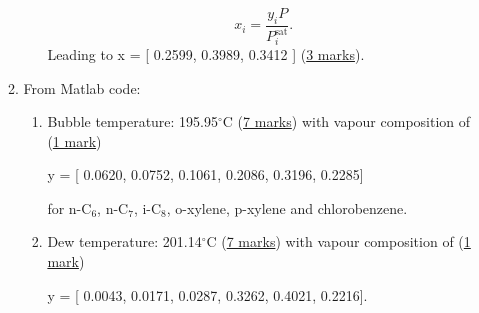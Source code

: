 \documentclass[12pts,a4paper,amsmath,amssymb,floatfix]{article}%
\newcommand{\frc}{\displaystyle\frac}
\begin{document}
\begin{enumerate}[label=\bfseries Problem \arabic*:]
\begin{enumerate}[label=\bfseries Task \arabic*:]
\begin{enumerate}
                      \begin{displaymath}
                         x_{i} = \frc{y_{i}P}{P_{i}^{\text{sat}}}.
                      \end{displaymath}
                      Leading to x = [ 0.2599, 0.3989, 0.3412 ] (\underline{3 marks}).    
            \end{enumerate}
%
          \item From Matlab code:
            \begin{enumerate}
               \item Bubble temperature: 195.95$^{\circ}$C (\underline{7 marks}) with vapour composition of (\underline{1 mark})
                   \begin{center}
                      y = [ 0.0620, 0.0752, 0.1061, 0.2086, 0.3196, 0.2285]
                   \end{center}
                   for n-C$_{6}$, n-C$_{7}$, i-C$_{8}$, o-xylene, p-xylene and chlorobenzene.
               \item Dew temperature: 201.14$^{\circ}$C (\underline{7 marks}) with vapour composition of (\underline{1 mark})
                   \begin{center}
                      y = [ 0.0043, 0.0171, 0.0287, 0.3262, 0.4021, 0.2216].
                   \end{center}
            \end{enumerate}
%
      \end{enumerate} 
%
\end{enumerate}
\end{document}
